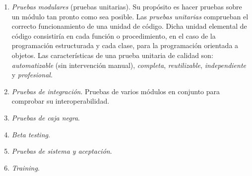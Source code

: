 \begin{enumerate}[noitemsep]
\item \emph{Pruebas modulares} (pruebas unitarias). Su propósito es hacer pruebas sobre un módulo tan pronto como sea posible. Las \emph{pruebas unitarias} comprueban el correcto funcionamiento de una unidad de código. Dicha unidad elemental de código consistiría en cada función o procedimiento, en el caso de la programación estructurada y cada clase, para la programación orientada a objetos. Las características de una prueba unitaria de calidad son: \emph{automatizable} (sin intervención manual), \emph{completa},  \emph{reutilizable}, \emph{independiente} y \emph{profesional}.

\item \emph{Pruebas de integración}. Pruebas de varios módulos en conjunto para comprobar su interoperabilidad.

\item \emph{Pruebas de caja negra}.

\item \emph{Beta testing}.

\item \emph{Pruebas de sistema y aceptación}.

\item \emph{Training}.
\end{enumerate}



